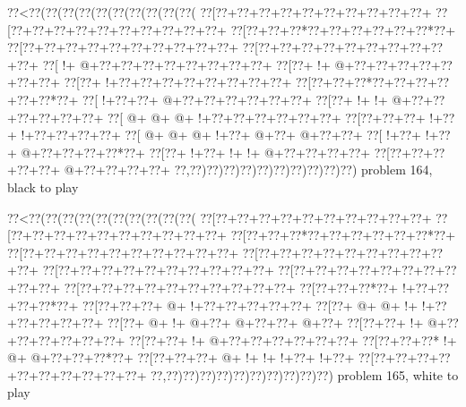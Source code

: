 \vbox{\vbox{\goo
\0??<\0??(\0??(\0??(\0??(\0??(\0??(\0??(\0??(\0??(\0??(
\0??[\0??+\0??+\0??+\0??+\0??+\0??+\0??+\0??+\0??+\0??+
\0??[\0??+\0??+\0??+\0??+\0??+\0??+\0??+\0??+\0??+\0??+
\0??[\0??+\0??+\0??*\0??+\0??+\0??+\0??+\0??+\0??*\0??+
\0??[\0??+\0??+\0??+\0??+\0??+\0??+\0??+\0??+\0??+\0??+
\0??[\0??+\0??+\0??+\0??+\0??+\0??+\0??+\0??+\0??+\0??+
\0??[\- !+\- @+\0??+\0??+\0??+\0??+\0??+\0??+\0??+\0??+
\0??[\0??+\- !+\- @+\0??+\0??+\0??+\0??+\0??+\0??+\0??+
\0??[\0??+\- !+\0??+\0??+\0??+\0??+\0??+\0??+\0??+\0??+
\0??[\0??+\0??+\0??*\0??+\0??+\0??+\0??+\0??+\0??*\0??+
\0??[\- !+\0??+\0??+\- @+\0??+\0??+\0??+\0??+\0??+\0??+
\0??[\0??+\- !+\- !+\- @+\0??+\0??+\0??+\0??+\0??+\0??+
\0??[\- @+\- @+\- @+\- !+\0??+\0??+\0??+\0??+\0??+\0??+
\0??[\0??+\0??+\0??+\- !+\0??+\- !+\0??+\0??+\0??+\0??+
\0??[\- @+\- @+\- @+\- !+\0??+\- @+\0??+\- @+\0??+\0??+
\0??[\- !+\0??+\- !+\0??+\- @+\0??+\0??+\0??+\0??*\0??+
\0??[\0??+\- !+\0??+\- !+\- !+\- @+\0??+\0??+\0??+\0??+
\0??[\0??+\0??+\0??+\0??+\0??+\- @+\0??+\0??+\0??+\0??+
\0??,\0??)\0??)\0??)\0??)\0??)\0??)\0??)\0??)\0??)\0??)
}
\hfil problem 164, black to play\hfil\break
}

\vbox{\vbox{\goo
\0??<\0??(\0??(\0??(\0??(\0??(\0??(\0??(\0??(\0??(\0??(
\0??[\0??+\0??+\0??+\0??+\0??+\0??+\0??+\0??+\0??+\0??+
\0??[\0??+\0??+\0??+\0??+\0??+\0??+\0??+\0??+\0??+\0??+
\0??[\0??+\0??+\0??*\0??+\0??+\0??+\0??+\0??+\0??*\0??+
\0??[\0??+\0??+\0??+\0??+\0??+\0??+\0??+\0??+\0??+\0??+
\0??[\0??+\0??+\0??+\0??+\0??+\0??+\0??+\0??+\0??+\0??+
\0??[\0??+\0??+\0??+\0??+\0??+\0??+\0??+\0??+\0??+\0??+
\0??[\0??+\0??+\0??+\0??+\0??+\0??+\0??+\0??+\0??+\0??+
\0??[\0??+\0??+\0??+\0??+\0??+\0??+\0??+\0??+\0??+\0??+
\0??[\0??+\0??+\0??*\0??+\- !+\0??+\0??+\0??+\0??*\0??+
\0??[\0??+\0??+\0??+\- @+\- !+\0??+\0??+\0??+\0??+\0??+
\0??[\0??+\- @+\- @+\- !+\- !+\0??+\0??+\0??+\0??+\0??+
\0??[\0??+\- @+\- !+\- @+\0??+\- @+\0??+\0??+\- @+\0??+
\0??[\0??+\0??+\- !+\- @+\0??+\0??+\0??+\0??+\0??+\0??+
\0??[\0??+\0??+\- !+\- @+\0??+\0??+\0??+\0??+\0??+\0??+
\0??[\0??+\0??+\0??*\- !+\- @+\- @+\0??+\0??+\0??*\0??+
\0??[\0??+\0??+\0??+\- @+\- !+\- !+\- !+\0??+\- !+\0??+
\0??[\0??+\0??+\0??+\0??+\0??+\0??+\0??+\0??+\0??+\0??+
\0??,\0??)\0??)\0??)\0??)\0??)\0??)\0??)\0??)\0??)\0??)
}
\hfil problem 165, white to play\hfil\break
}

